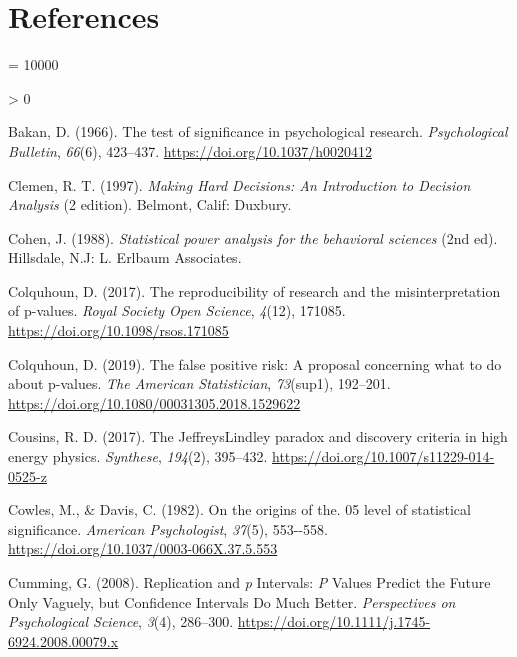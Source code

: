 \documentclass[
  english,
  ,jou, a4paper,floatsintext]{apa6}
\newlength{\cslhangindent}
\newenvironment{CSLReferences}[2] %
 {%
  \setlength{\parindent}{0pt}
  \ifodd #1 \everypar{\setlength{\hangindent}{\cslhangindent}}\ignorespaces\fi
  \ifnum #2 > 0
  \setlength{\parskip}{#2\baselineskip}
  \fi
 }%
 {}
\begin{document}
\hypertarget{references}{%
\section{References}\label{references}}

\begingroup

\interlinepenalty = 10000

\hypertarget{refs}{}
\begin{CSLReferences}{1}{0}
\leavevmode\hypertarget{ref-bakan_test_1966}{}%
Bakan, D. (1966). The test of significance in psychological research. \emph{Psychological Bulletin}, \emph{66}(6), 423--437. \url{https://doi.org/10.1037/h0020412}

\leavevmode\hypertarget{ref-clemen_making_1997}{}%
Clemen, R. T. (1997). \emph{Making {Hard} {Decisions}: {An} {Introduction} to {Decision} {Analysis}} (2 edition). Belmont, Calif: Duxbury.

\leavevmode\hypertarget{ref-cohen_statistical_1988}{}%
Cohen, J. (1988). \emph{Statistical power analysis for the behavioral sciences} (2nd ed). {Hillsdale, N.J}: {L. Erlbaum Associates}.

\leavevmode\hypertarget{ref-colquhoun_reproducibility_2017}{}%
Colquhoun, D. (2017). The reproducibility of research and the misinterpretation of p-values. \emph{Royal Society Open Science}, \emph{4}(12), 171085. \url{https://doi.org/10.1098/rsos.171085}

\leavevmode\hypertarget{ref-colquhoun_false_2019}{}%
Colquhoun, D. (2019). The false positive risk: A proposal concerning what to do about p-values. \emph{The American Statistician}, \emph{73}(sup1), 192--201. \url{https://doi.org/10.1080/00031305.2018.1529622}

\leavevmode\hypertarget{ref-cousins_jeffreyslindley_2017}{}%
Cousins, R. D. (2017). The {Jeffreys}{{Lindley}} paradox and discovery criteria in high energy physics. \emph{Synthese}, \emph{194}(2), 395--432. \url{https://doi.org/10.1007/s11229-014-0525-z}

\leavevmode\hypertarget{ref-cowles_origins_1982}{}%
Cowles, M., \& Davis, C. (1982). On the origins of the. 05 level of statistical significance. \emph{American Psychologist}, \emph{37}(5), 553-\/-558. \url{https://doi.org/10.1037/0003-066X.37.5.553}

\leavevmode\hypertarget{ref-cumming_replication_2008}{}%
Cumming, G. (2008). Replication and {\emph{p}} {Intervals}: {\emph{P}} {Values Predict} the {Future Only Vaguely}, but {Confidence Intervals Do Much Better}. \emph{Perspectives on Psychological Science}, \emph{3}(4), 286--300. \url{https://doi.org/10.1111/j.1745-6924.2008.00079.x}


\end{CSLReferences}
\end{document}

